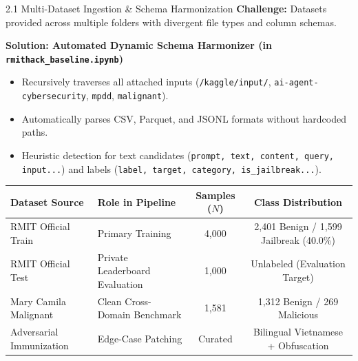 \documentclass[aspectratio=169]{beamer}
\begin{document}
\begin{frame}{2.1 Multi-Dataset Ingestion \& Schema Harmonization}
\textbf{Challenge:} Datasets provided across multiple folders with divergent file types and column schemas.

\vspace{0.25cm}
\textbf{Solution: Automated Dynamic Schema Harmonizer (in \texttt{rmithack\_baseline.ipynb})}
\begin{itemize}
    \item Recursively traverses all attached inputs (\texttt{/kaggle/input/}, \texttt{ai-agent-cybersecurity}, \texttt{mpdd}, \texttt{malignant}).
    \item Automatically parses CSV, Parquet, and JSONL formats without hardcoded paths.
    \item Heuristic detection for text candidates (\texttt{prompt, text, content, query, input...}) and labels (\texttt{label, target, category, is\_jailbreak...}).
\end{itemize}

\vspace{0.25cm}
\begin{table}[h]
\centering
\scriptsize
\begin{tabular}{@{}llcc@{}}
\toprule
\textbf{Dataset Source} & \textbf{Role in Pipeline} & \textbf{Samples ($N$)} & \textbf{Class Distribution} \\ \midrule
RMIT Official Train & Primary Training & 4,000 & 2,401 Benign / 1,599 Jailbreak (40.0\%) \\
RMIT Official Test & Private Leaderboard Evaluation & 1,000 & Unlabeled (Evaluation Target) \\
Mary Camila Malignant & Clean Cross-Domain Benchmark & 1,581 & 1,312 Benign / 269 Malicious \\
Adversarial Immunization & Edge-Case Patching & Curated & Bilingual Vietnamese + Obfuscation \\ \bottomrule
\end{tabular}
\end{table}
\end{frame}
\end{document}
